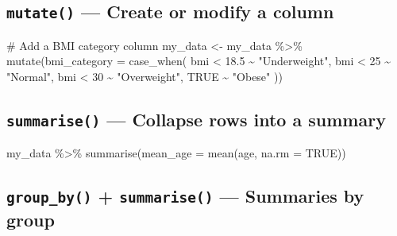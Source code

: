 \documentclass[
  letterpaper,
  DIV=11,
  numbers=noendperiod,
  oneside]{scrreprt}
\newenvironment{Shaded}{\begin{snugshade}}{\end{snugshade}}
\newcommand{\AttributeTok}[1]{\textcolor[rgb]{0.40,0.45,0.13}{#1}}
\newcommand{\CommentTok}[1]{\textcolor[rgb]{0.37,0.37,0.37}{#1}}
\newcommand{\ConstantTok}[1]{\textcolor[rgb]{0.56,0.35,0.01}{#1}}
\newcommand{\DecValTok}[1]{\textcolor[rgb]{0.68,0.00,0.00}{#1}}
\newcommand{\FloatTok}[1]{\textcolor[rgb]{0.68,0.00,0.00}{#1}}
\newcommand{\FunctionTok}[1]{\textcolor[rgb]{0.28,0.35,0.67}{#1}}
\newcommand{\NormalTok}[1]{\textcolor[rgb]{0.00,0.23,0.31}{#1}}
\newcommand{\OtherTok}[1]{\textcolor[rgb]{0.00,0.23,0.31}{#1}}
\newcommand{\SpecialCharTok}[1]{\textcolor[rgb]{0.37,0.37,0.37}{#1}}
\newcommand{\StringTok}[1]{\textcolor[rgb]{0.13,0.47,0.30}{#1}}
\begin{document}
\subsection*{\texorpdfstring{\texttt{mutate()} --- Create or modify a
column}{mutate() --- Create or modify a column}}\label{mutate-create-or-modify-a-column}

\begin{Shaded}
\begin{Highlighting}[numbers=left,,]
\CommentTok{\# Add a BMI category column}
\NormalTok{my\_data }\OtherTok{\textless{}{-}}\NormalTok{ my\_data }\SpecialCharTok{\%\textgreater{}\%}
  \FunctionTok{mutate}\NormalTok{(}\AttributeTok{bmi\_category =} \FunctionTok{case\_when}\NormalTok{(}
\NormalTok{    bmi }\SpecialCharTok{\textless{}} \FloatTok{18.5} \SpecialCharTok{\textasciitilde{}} \StringTok{"Underweight"}\NormalTok{,}
\NormalTok{    bmi }\SpecialCharTok{\textless{}} \DecValTok{25}   \SpecialCharTok{\textasciitilde{}} \StringTok{"Normal"}\NormalTok{,}
\NormalTok{    bmi }\SpecialCharTok{\textless{}} \DecValTok{30}   \SpecialCharTok{\textasciitilde{}} \StringTok{"Overweight"}\NormalTok{,}
    \ConstantTok{TRUE}       \SpecialCharTok{\textasciitilde{}} \StringTok{"Obese"}
\NormalTok{  ))}
\end{Highlighting}
\end{Shaded}

\subsection*{\texorpdfstring{\texttt{summarise()} --- Collapse rows into
a
summary}{summarise() --- Collapse rows into a summary}}\label{summarise-collapse-rows-into-a-summary}

\begin{Shaded}
\begin{Highlighting}[numbers=left,,]
\NormalTok{my\_data }\SpecialCharTok{\%\textgreater{}\%} \FunctionTok{summarise}\NormalTok{(}\AttributeTok{mean\_age =} \FunctionTok{mean}\NormalTok{(age, }\AttributeTok{na.rm =} \ConstantTok{TRUE}\NormalTok{))}
\end{Highlighting}
\end{Shaded}

\subsection*{\texorpdfstring{\texttt{group\_by()} + \texttt{summarise()}
--- Summaries by
group}{group\_by() + summarise() --- Summaries by group}}\label{group_by-summarise-summaries-by-group}
\end{document}
